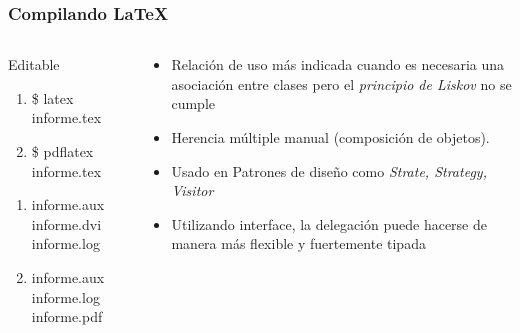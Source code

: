 \begin{frame}
    \frametitle{Compilando \LaTeX{}}

    \begin{columns}[onlytextwidth]
        \begin{column}{0.48\textwidth}
            \centering
            \begin{exampleblock}{Editable} %
                \begin{center}
                    \begin{enumerate}                        
                        \item { \ttfamily \$ latex informe.tex}
                        \item { \ttfamily \$ pdflatex informe.tex}
                    \end{enumerate}                                     
                \end{center}
            \end{exampleblock}
            \begin{enumerate}
                \item { \ttfamily informe.aux  informe.dvi  informe.log}
                \item { \ttfamily  informe.aux  informe.log  informe.pdf}
            \end{enumerate}
            
        \end{column}
        
        \begin{column}{0.46\textwidth}
            \begin{exampleblock}{} %
                \begin{itemize}
\item  Relación de uso más indicada cuando es necesaria una asociación entre clases pero el \textit{principio de Liskov} no se cumple
\item  Herencia múltiple manual (composición de objetos). 
\item  Usado en Patrones de diseño como \textit{Strate, Strategy, Visitor}

\item %
Utilizando interface, la delegación puede hacerse de manera más flexible y fuertemente tipada
\end{itemize}

\end{exampleblock}
\end{column}
\end{columns} 
\end{frame}

